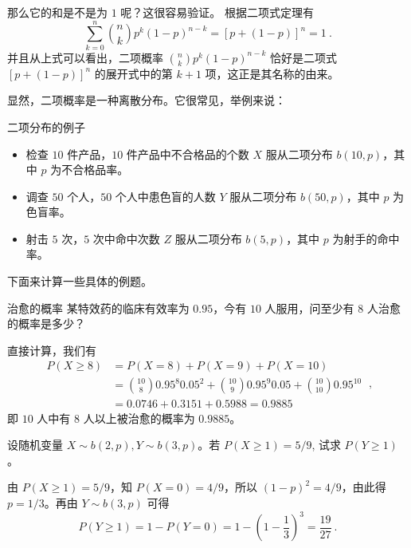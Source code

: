 那么它的和是不是为 $1$ 呢？这很容易验证。 根据二项式定理有
\begin{equation}
\sum_{k=0}^{n}\binom nk p^{k}(1-p)^{n-k}=[p+(1-p)]^{n}=1~.
\end{equation}
并且从上式可以看出，二项概率 $\binom nk p^{k}(1-p)^{n-k}$ 恰好是二项式 $[p+(1-p)]^{n}$ 的展开式中的第 $k+1$ 项，这正是其名称的由来。

显然，二项概率是一种离散分布。它很常见，举例来说：
\begin{example}{二项分布的例子}
\begin{itemize}
\item 检查 $10$ 件产品，$ 10 $ 件产品中不合格品的个数 $X $ 服从二项分布 $b(10,p)$，其中 $p$ 为不合格品率。
\item 调查 $50 $ 个人，$ 50 $ 个人中患色盲的人数 $Y $ 服从二项分布 $b(50,p)$，其中 $p$ 为色盲率。
\item 射击 $5 $ 次，$ 5 $ 次中命中次数 $Z $ 服从二项分布 $b(5,p)$，其中 $p $ 为射手的命中率。
\end{itemize}
\end{example}

下面来计算一些具体的例题。
\begin{example}{治愈的概率}
某特效药的临床有效率为 $0. 95$，今有 $10 $ 人服用，问至少有 $8 $ 人治愈的概率是多少？

直接计算，我们有
\begin{equation}
\begin{aligned} P(X \geqslant 8) &=P(X=8)+P(X=9)+P(X=10) \\ &=\binom{10}{8} 0.95^{8} 0.05^{2}+\binom{10}{9} 0.95^{9} 0.05+\binom{10}{10} 0.95^{10} \\ &=0.0746+0.3151+0.5988=0.9885 \end{aligned}~,
\end{equation}
即 $10 $ 人中有 $8 $ 人以上被治愈的概率为 $0. 988 5$。
\end{example}

\begin{example}{}
设随机变量 $X\sim b(2,p),Y\sim b(3,p)$。若 $P (X\geqslant1) = 5/9$, 试求 $P(Y\geqslant1)$。

由 $P(X\geqslant1)=5/9$，知 $P(X=0)=4/9$，所以 $(1-p)^2=4/9$，由此得 $p=1/3$。再由 $Y\sim b(3,p)$ 可得
\begin{equation}
P(Y \geqslant 1)=1-P(Y=0)=1-\left(1-\frac{1}{3}\right)^{3}=\frac{19}{27}~.
\end{equation}
\end{example}

